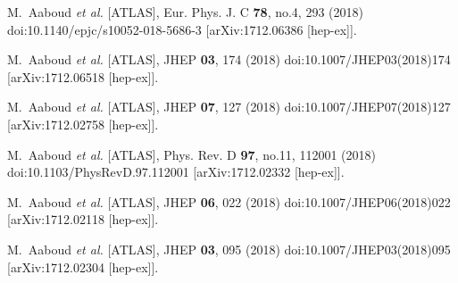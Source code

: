 \begin{thebibliography}{9}
M.~Aaboud \textit{et al.} [ATLAS],
Eur. Phys. J. C \textbf{78}, no.4, 293 (2018)
doi:10.1140/epjc/s10052-018-5686-3
[arXiv:1712.06386 [hep-ex]].

M.~Aaboud \textit{et al.} [ATLAS],
JHEP \textbf{03}, 174 (2018)
doi:10.1007/JHEP03(2018)174
[arXiv:1712.06518 [hep-ex]].

M.~Aaboud \textit{et al.} [ATLAS],
JHEP \textbf{07}, 127 (2018)
doi:10.1007/JHEP07(2018)127
[arXiv:1712.02758 [hep-ex]].

M.~Aaboud \textit{et al.} [ATLAS],
Phys. Rev. D \textbf{97}, no.11, 112001 (2018)
doi:10.1103/PhysRevD.97.112001
[arXiv:1712.02332 [hep-ex]].

M.~Aaboud \textit{et al.} [ATLAS],
JHEP \textbf{06}, 022 (2018)
doi:10.1007/JHEP06(2018)022
[arXiv:1712.02118 [hep-ex]].

M.~Aaboud \textit{et al.} [ATLAS],
JHEP \textbf{03}, 095 (2018)
doi:10.1007/JHEP03(2018)095
[arXiv:1712.02304 [hep-ex]].


\end{thebibliography}

